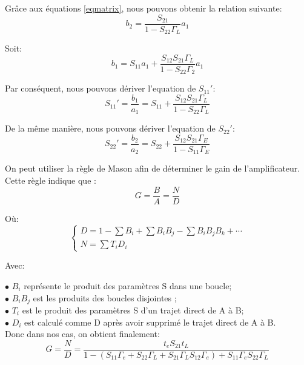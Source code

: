 \documentclass[french]{article}
\begin{document}
Grâce aux équations \ref{eqmatrix}, nous pouvons obtenir la relation suivante:
\begin{equation}
	b_{2}=\frac{S_{21}}{1-S_{22}\Gamma_{L}}a_{1}
\end{equation}

Soit: 
\begin{equation}
	b_{1}=S_{11}a_{1}+\frac{S_{12}S_{21}\Gamma_{L}}{1-S_{22}\Gamma_{2}}a_{1}
\end{equation}

Par conséquent, nous pouvons dériver l'equation de ${S_{11}}'$:
\begin{equation}
	{S_{11}}'=\frac{b_{1}}{a_{1}}
	=S_{11}+\frac{S_{12}S_{21}\Gamma_{L}}{1-S_{22}\Gamma_{L}}
\end{equation}

De la même manière, nous pouvons dériver l'equation de ${S_{22}}'$:
\begin{equation}
	{S_{22}}'=\frac{b_{2}}{a_{2}}
	=S_{22}+\frac{S_{12}S_{21}\Gamma_{E}}{1-S_{11}\Gamma_{E}}
\end{equation}

On peut utiliser la règle de Mason afin de déterminer le gain de l’amplificateur. Cette règle indique que :
\begin{equation}
	G=\frac{B}{A}=\frac{N}{D}
\end{equation}

Où:
\begin{equation}
	\left\{\begin{matrix}
		D=1-\sum{B_{i}}+\sum{B_{i}B_{j}}-\sum{B_{i}B_{j}B_{k}}+{\cdots}\\ 
		N=\sum{T_{i}D_{i}}
	\end{matrix}\right.
\end{equation}

Avec:

$\bullet$ $B_{i}$ représente le produit des paramètres S dans une boucle;\\
$\bullet$ $B_{i}B_{j}$ est les produits des boucles disjointes ;\\
$\bullet$ $T_{i}$ est le produit des paramètres S d’un trajet direct de A à B;\\
$\bullet$ $D_{i}$ est calculé comme D après avoir supprimé le trajet direct de A à B.\\

Donc dans nos cas, on obtient finalement:
\begin{equation}
	G=\frac{N}{D}=\frac{t_{e}S_{21}t_{L}}{1-\left (S_{11}\Gamma_{e}+S_{22}\Gamma_{L}+S_{21}\Gamma_{L}S_{12}\Gamma_{e}\right)+S_{11}\Gamma_{e}S_{22}\Gamma_{L}}
\end{equation}
\end{document}
